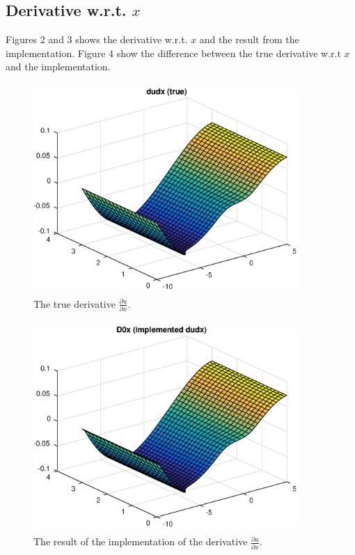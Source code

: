 \documentclass[a4paper,10pt]{article}
\begin{document}
\subsection*{Derivative w.r.t. $x$}

Figures 2 and 3 shows the derivative w.r.t. $x$ and the result from the implementation.
Figure 4 show the difference between the true derivative w.r.t $x$ and the implementation.



\begin{figure}[ht]
  \centering
  \includegraphics[width = 10cm, height = 8cm]{dudx}
  \begin{minipage}[t]{100mm}
    \caption{
      The true derivative $\tfrac{\partial u}{\partial x}$.
    }\label{FIG_jjj}
  \end{minipage}
\end{figure}


\begin{figure}[ht]
  \centering
  \includegraphics[width = 10cm, height = 8cm]{D0x}
  \begin{minipage}[t]{100mm}
    \caption{
      The result of the implementation of the derivative $\tfrac{\partial u}{\partial x}$.
    }\label{FIG_jjj}
  \end{minipage}
\end{figure}
\end{document}
